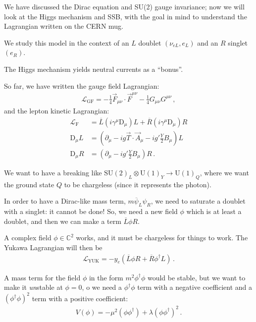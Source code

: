 \documentclass[main.tex]{subfiles}
\begin{document}

We have discussed the Dirac equation and SU(2) gauge invariance; 
now we will look at the Higgs mechanism and SSB, with the goal in mind
to understand the Lagrangian written on the CERN mug. 

We study this model in the context of an \(L\) doublet \((\nu _{eL}, e_L)\) and an \(R\) singlet \((e_R)\). 

The Higgs mechanism yields neutral currents as a ``bonus''. 

So far, we have written the gauge field Lagrangian: 
%
\begin{align}
\mathscr{L} _{\text{GF}} = - \frac{1}{4} \vec{F}_{\mu \nu } \cdot \vec{F}^{\mu \nu } - \frac{1}{4} G_{\mu \nu } G^{\mu \nu }
\,,
\end{align}
%
and the lepton kinetic Lagrangian: 
%
\begin{align}
\mathscr{L} _{\text{F}} &= \overline{L} (i \gamma^{\mu } \text{D}_\mu ) L + \overline{R} (i \gamma^{\mu } \text{D}_\mu ) R  \\
\text{D}_\mu L &= \left(\partial_{\mu } - ig \vec{T} \cdot \vec{A}_\mu  - ig' \frac{Y}{2} B_\mu \right)L \\
\text{D}_\mu R &= \left(\partial_{\mu } - ig' \frac{Y}{2} B_\mu \right)R
\,.
\end{align}

We want to have a breaking like \(\text{SU}(2)_L \otimes \text{U}(1)_Y \to \text{U}(1)_Q\), where we want the ground state \(Q\) to be chargeless (since it represents the photon).

In order to have a Dirac-like mass term, \(m \overline{\psi}_L \psi _R\), we need to saturate a doublet with a singlet: it cannot be done! 
So, we need a new field \(\phi \) which is at least a doublet, and then we can make a term \(\overline{L} \phi  R\). 

A complex field \(\phi \in \mathbb{C}^2\) works, and it must be chargeless for things to work.  
The Yukawa Lagrangian will then be 
%
\begin{align}
\mathscr{L} _{\text{YUK}} = - y_e \left(\overline{L} \phi R + \overline{R} \phi ^\dag L\right)
\,.
\end{align}

A mass term for the field \(\phi \) in the form \(m^2 \phi ^\dag \phi \) would be stable, but we want to make it \emph{un}stable at \(\phi = 0\), o we need a \(\phi ^\dag \phi \) term with a negative coefficient and a \((\phi ^\dag \phi )^2\) term with a positive coefficient: 
%
\begin{align}
V(\phi ) = - \mu^2 (\phi \phi ^\dag) + \lambda (\phi \phi ^\dag)^2
\,.
\end{align}
\end{document}
